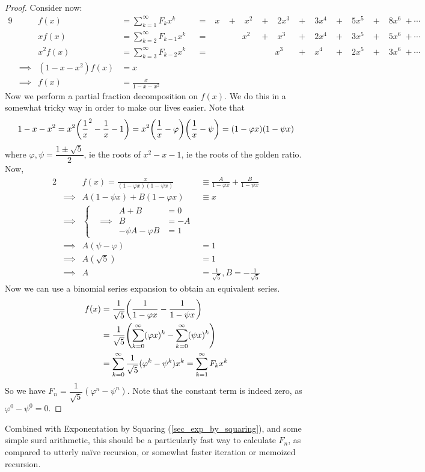 \begin{proof}
Consider now:
\begin{alignat*}9
&& f(x) &= \sum_{k = 1}^\infty F_k x^k
    &&=&\; x\; &+&\; x^2\; &+&\; 2x^3\; &+&\;
        3x^4\; &+&\; 5x^5\; &+&\; 8x^6\; + \dotsb \\
&& x f(x) &= \sum_{k = 2}^\infty F_{k - 1} x^k
    &&=&\; &&x^2\; &+&\; x^3\; &+&\; 2x^4\; &+&\;
        3x^5\; &+&\; 5x^6\; + \dotsb \\
&& x^2 f(x) &= \sum_{k = 3}^\infty F_{k - 2}x^k
    &&=&\; &&&& x^3\; &+&\; x^4\; &+&\; 2x^5\; &+&\; 3x^6\; + \dotsb \\
&\implies& (1 - x - x^2) f(x) &= x \\
&\implies& f(x) &= \frac x{1 - x - x^2}
\end{alignat*}
Now we perform a partial fraction decomposition on \(f(x)\). We do this in a
somewhat tricky way in order to make our lives easier. Note that
\begin{equation*}
1 - x - x^2 = x^2 \pqty{\frac 1x^2 - \frac 1x - 1}
    = x^2\pqty{\frac 1x - \varphi}\pqty{\frac 1x - \psi}
    = (1 - \varphi x)(1 - \psi x)
\end{equation*}
where \(\varphi, \psi = \dfrac{1 \pm \sqrt 5}2\), ie the roots of
\(x^2 - x - 1\), ie the roots of the golden ratio. Now,
\begin{alignat*}2
&& f(x) = \frac x{(1 - \varphi x)(1 - \psi x)}
    &\equiv \frac A{1 - \varphi x} + \frac B{1 - \psi x} \\
&\implies& A(1 - \psi x) + B(1 - \varphi x) &\equiv x \\
&\implies& \left\{
    \begin{aligned}
        && A + B &= 0 \\
        &\implies& B &= -A  \\
        && -\psi A - \varphi B &= 1
    \end{aligned} \right. \\
&\implies& A(\psi - \varphi) &= 1 \\
&\implies& A(\sqrt 5) &= 1 \\
&\implies& A &= \frac 1{\sqrt 5}, B = -\frac 1{\sqrt 5}
\end{alignat*}
Now we can use a binomial series expansion to obtain an equivalent series.
\begin{align*}
f(x) &= \frac 1{\sqrt 5}\pqty{\frac 1{1 - \varphi x}
                            - \frac 1{1 - \psi x}} \\
&= \frac 1{\sqrt 5}\pqty{\sum_{k = 0}^\infty (\varphi x)^k
                       - \sum_{k = 0}^\infty (\psi x)^k} \\
&= \sum_{k = 0}^\infty \frac 1{\sqrt 5}(\varphi^k - \psi^k)x^k
= \sum_{k = 1}^\infty F_k x^k
\end{align*}
So we have \(F_n = \dfrac 1{\sqrt 5}(\varphi^n - \psi^n)\). Note that the
constant term is indeed zero, as \(\varphi^0 - \psi^0 = 0\).
\end{proof}
Combined with Exponentation by Squaring (\ref{sec_exp_by_squaring}), and
some simple surd arithmetic, this should be a particularly fast way to
calculate \(F_n\), as compared to utterly na\"ive recursion, or somewhat
faster iteration or memoized recursion.

